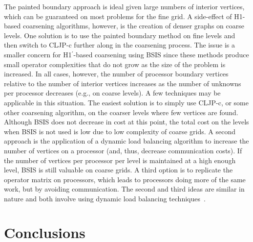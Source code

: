 \documentclass{elsart}
\begin{document}
The painted boundary approach is ideal given large numbers of interior
vertices, which can be guaranteed on most problems for the fine grid.
A side-effect of H1-based coarsening algorithms, however, is the
creation of denser graphs on coarse levels. One solution is to use the
painted boundary method on fine levels and then switch to CLJP-c
further along in the coarsening process. The issue is a smaller
concern for H1$^\prime$-based coarsening using BSIS since these
methods produce small operator complexities that do not grow as the
size of the problem is increased. In all cases, however, the number of
processor boundary vertices relative to the number of interior
vertices increases as the number of unknowns per processor decreases
(e.g., on coarse levels). A few techniques may be applicable in this
situation. The easiest solution is to simply use CLJP-c, or some other
coarsening algorithm, on the coarser levels where few vertices are
found. Although BSIS does not decrease in cost at this point, the
total cost on the levels when BSIS is not used is low due to low
complexity of coarse grids. A second approach is the application of a
dynamic load balancing algorithm to increase the number of vertices on
a processor (and, thus, decrease communication costs). If the number
of vertices per processor per level is maintained at a high enough
level, BSIS is still valuable on coarse grids. A third option is to
replicate the operator matrix on processors, which leads to processors
doing more of the same work, but by avoiding communication. The second
and third ideas are similar in nature and both involve using dynamic
load balancing
techniques~\cite{DevineBomanKarypisPP04,CybDLB,deCoughnyLB,SchloegelLB,ZoltanParHyp06ipdps,ZoltanParHypRepart07}.

\section{Conclusions}
\label{sec:conclusions}




\end{document}
